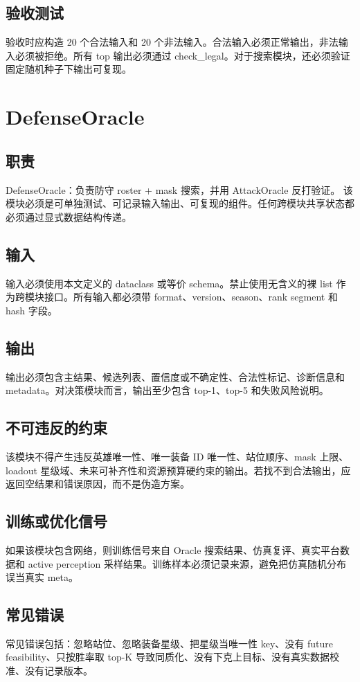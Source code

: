 \documentclass[UTF8,12pt,openany]{ctexbook}
\begin{document}
\subsection{验收测试}
验收时应构造 20 个合法输入和 20 个非法输入。合法输入必须正常输出，非法输入必须被拒绝。所有 top 输出必须通过 check\_legal。对于搜索模块，还必须验证固定随机种子下输出可复现。

\section{DefenseOracle}
\subsection{职责}
DefenseOracle：负责防守 roster + mask 搜索，并用 AttackOracle 反打验证。 该模块必须是可单独测试、可记录输入输出、可复现的组件。任何跨模块共享状态都必须通过显式数据结构传递。

\subsection{输入}
输入必须使用本文定义的 dataclass 或等价 schema。禁止使用无含义的裸 list 作为跨模块接口。所有输入都必须带 format、version、season、rank segment 和 hash 字段。

\subsection{输出}
输出必须包含主结果、候选列表、置信度或不确定性、合法性标记、诊断信息和 metadata。对决策模块而言，输出至少包含 top-1、top-5 和失败风险说明。

\subsection{不可违反的约束}
该模块不得产生违反英雄唯一性、唯一装备 ID 唯一性、站位顺序、mask 上限、loadout 星级域、未来可补齐性和资源预算硬约束的输出。若找不到合法输出，应返回空结果和错误原因，而不是伪造方案。

\subsection{训练或优化信号}
如果该模块包含网络，则训练信号来自 Oracle 搜索结果、仿真复评、真实平台数据和 active perception 采样结果。训练样本必须记录来源，避免把仿真随机分布误当真实 meta。

\subsection{常见错误}
常见错误包括：忽略站位、忽略装备星级、把星级当唯一性 key、没有 future feasibility、只按胜率取 top-K 导致同质化、没有下克上目标、没有真实数据校准、没有记录版本。
\end{document}

